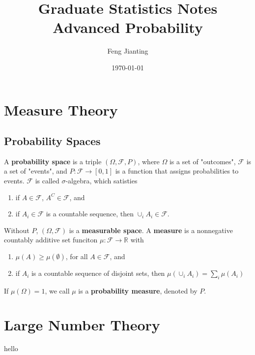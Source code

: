 \documentclass{amsbook}
\begin{document}
\title{Graduate Statistics Notes \\ Advanced Probability}
\author{Feng Jianting}
\date{\today}
\maketitle
\tableofcontents
\section{Measure Theory}
\subsection{Probability Spaces}
A \textbf{probability space} is a triple $(\Omega, \mathcal{F}, P)$, where $\Omega$ is a set of "outcomes", $\mathcal{F}$ is a set of "events", and $P: \mathcal{F}\to [0, 1]$ is a function that assigns probabilities to events. $\mathcal{F}$ is called $\sigma$-algebra, which satisties
\begin{enumerate}
	\item if $A\in\mathcal{F}$, $A^C\in\mathcal{F}$, and
	\item if $A_i \in \mathcal{F}$ is a countable sequence, then $\cup_{i}A_i\in \mathcal{F}$.
\end{enumerate}
Without $P$, $(\Omega, \mathcal{F})$ is a \textbf{measurable space}. A \textbf{measure} is a nonnegative countably additive set funciton $\mu: \mathcal{F}\to \mathbb{R}$ with
\begin{enumerate}
	\item $\mu(A)\geq\mu(\emptyset)$, for all $A\in \mathcal{F}$, and
	\item if $A_i$ is a countable sequence of disjoint sets, then $
		      \mu(\cup_i A_i) = \sum_i \mu(A_i)
	      $
\end{enumerate}
If $\mu(\Omega) = 1$, we call $\mu$ is a \textbf{probability measure}, denoted by $P$.
\section{Large Number Theory}

hello
% 
% 
\end{document}
